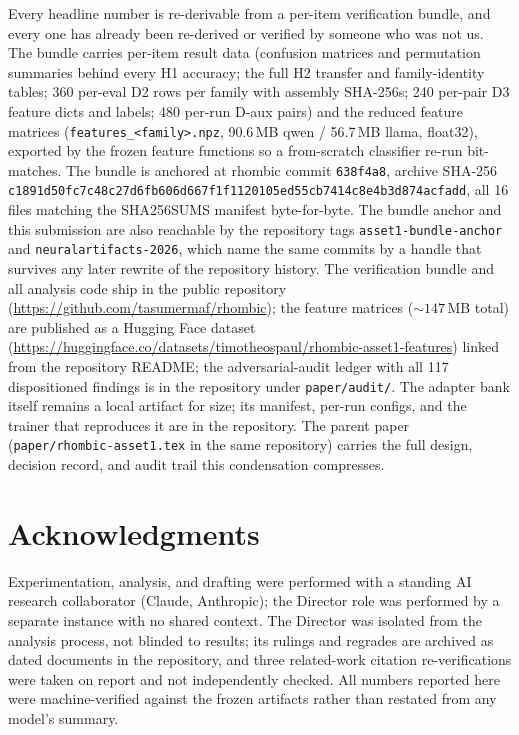 \documentclass{article}
\begin{document}
Every headline number is re-derivable from a per-item verification bundle,
and every one has already been re-derived or verified by someone who was
not us. The bundle carries per-item result data (confusion matrices and
permutation summaries behind every H1 accuracy; the full H2 transfer and
family-identity tables; 360 per-eval D2 rows per family with assembly
SHA-256s; 240 per-pair D3 feature dicts and labels; 480 per-run D-aux
pairs) and the reduced feature matrices
(\texttt{features\_<family>.npz}, 90.6\,MB qwen / 56.7\,MB llama, float32),
exported by the frozen feature functions so a from-scratch classifier
re-run bit-matches. The bundle is anchored at rhombic commit
\texttt{638f4a8}, archive SHA-256
{\small\texttt{c1891d50fc7c48c27d6fb606d667f1f1120105ed55cb7414c8e4b3d874acfadd}},
all 16 files matching the SHA256SUMS manifest byte-for-byte. The bundle
anchor and this submission are also reachable by the repository tags
\texttt{asset1-bundle-anchor} and \texttt{neuralartifacts-2026}, which
name the same commits by a handle that survives any later rewrite of the
repository history. The
verification bundle and all analysis code ship in the public repository
(\url{https://github.com/tasumermaf/rhombic}); the feature matrices
(${\sim}147$\,MB total) are published as a Hugging Face dataset
(\url{https://huggingface.co/datasets/timotheospaul/rhombic-asset1-features})
linked from the repository README; the adversarial-audit ledger with all
117 dispositioned findings is in the repository under
\texttt{paper/audit/}. The adapter bank itself remains a local artifact for
size; its manifest, per-run configs, and the trainer that reproduces it are
in the repository. The parent paper (\texttt{paper/rhombic-asset1.tex} in
the same repository) carries the full design, decision record, and audit
trail this condensation compresses.

\section*{Acknowledgments}
Experimentation, analysis, and drafting were performed with a standing AI
research collaborator (Claude, Anthropic); the Director role was performed
by a separate instance with no shared context. The Director was isolated
from the analysis process, not blinded to results; its rulings and
regrades are archived as dated documents in the repository, and three
related-work citation re-verifications were taken on report and not
independently checked. All numbers reported here were machine-verified
against the frozen artifacts rather than restated from any model's
summary.
\end{document}
